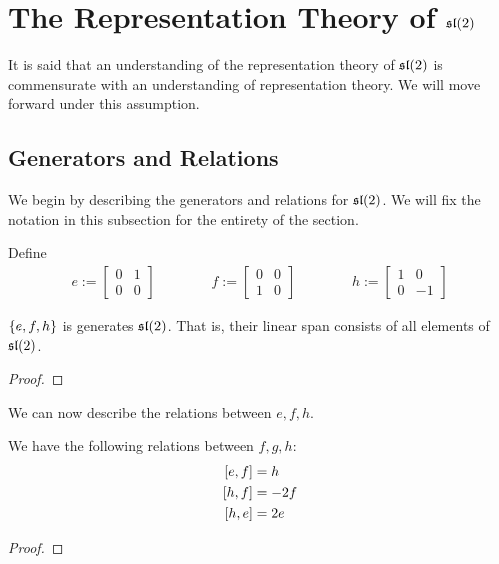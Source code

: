 \section{The Representation Theory of $\sl{2}$}

It is said that an understanding of the representation theory of $\sl{2}$ is commensurate with an understanding of representation theory. We will move forward under this assumption.

\subsection{Generators and Relations}

We begin by describing the generators and relations for $\sl{2}$. We will fix the notation in this subsection for the entirety of the section.

Define
\begin{align}
    e :=
    \begin{bmatrix}
        0 & 1 \\ 0 & 0
    \end{bmatrix}
    \qquad\qquad
    f :=
    \begin{bmatrix}
        0 & 0 \\ 1 & 0
    \end{bmatrix}
    \qquad\qquad
    h :=
    \begin{bmatrix}
        1 & 0 \\ 0 & -1
    \end{bmatrix}
\end{align}

\begin{boxproposition}[Generators of $\sl{2}$]
    $\left\{ e, f, h \right\}$ is generates $\sl{2}$. That is, their linear span consists of all elements of $\sl{2}$.
\end{boxproposition}
\begin{proof}
    \sorry
\end{proof}

We can now describe the relations between $e, f, h$.

\begin{boxproposition}
    We have the following relations between $f, g, h$:
    \begin{align}
        \left[ e, f \right] &= h \\
        \left[ h, f \right] &= -2f \\
        \left[ h, e \right] &= 2e
    \end{align}
\end{boxproposition}
\begin{proof}
    \sorry
\end{proof}

